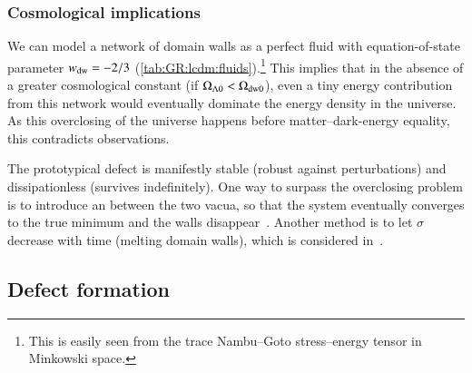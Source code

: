     \subsubsection{Cosmological implications}
        We can model a network of domain walls as a perfect fluid with equation-of-state parameter $w_\mathrm{dw}= -2/3$ (\cref{tab:GR:lcdm:fluids}).\footnote{This is easily seen from the trace Nambu--Goto stress--energy tensor in Minkowski space.} This implies that in the absence of a greater cosmological constant (if $\Omega_{\Lambda 0} < \Omega_\mathrm{dw0}$), 
        even a tiny energy contribution from this network would eventually dominate the energy density in the universe. As this overclosing of the universe happens before matter--dark-energy equality, this contradicts observations.

        The prototypical defect is manifestly stable (robust against perturbations) and dissipationless (survives indefinitely). One way to surpass the overclosing problem is to introduce an  between the two vacua, so that the system eventually converges to the true minimum and the walls disappear~\citep{saikawaReviewGravitationalWaves2017}. Another method is to let $\sigma$ decrease with time (melting domain walls), which is considered in~\citet{babichevNANOGravSpectralIndex2023}.


















\subsection{Defect formation}\label{sec:cosmo:defects:formation}

